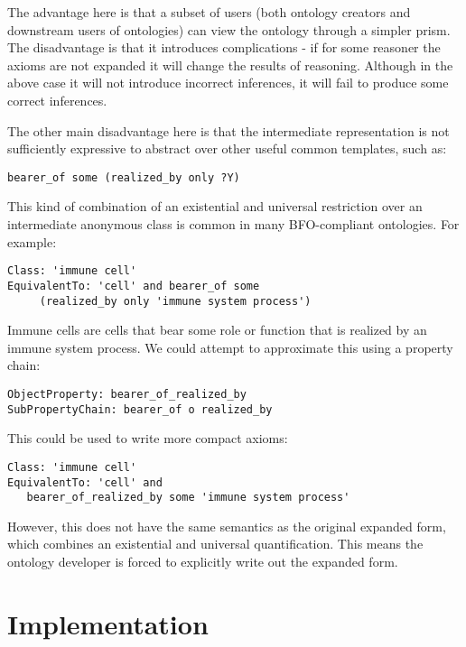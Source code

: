 \documentclass[11pt]{article}
\begin{document}

The advantage here is that a subset of users (both ontology creators
and downstream users of ontologies) can view the ontology through a
simpler prism. The disadvantage is that it introduces complications -
if for some reasoner the axioms are not expanded it will change the
results of reasoning. Although in the above case it will not introduce
incorrect inferences, it will fail to produce some correct inferences.

The other main disadvantage here is that the intermediate
representation is not sufficiently expressive to abstract over other
useful common templates, such as:

\begin{verbatim}
bearer_of some (realized_by only ?Y)
\end{verbatim}

This kind of combination of an existential and universal restriction
over an intermediate anonymous class is common in many BFO-compliant
ontologies. For example:

\begin{verbatim}
Class: 'immune cell'
EquivalentTo: 'cell' and bearer_of some 
     (realized_by only 'immune system process')
\end{verbatim}

Immune cells are cells that bear some role or function that is
realized by an immune system process.  We could attempt to approximate
this using a property chain:

\begin{verbatim}
ObjectProperty: bearer_of_realized_by
SubPropertyChain: bearer_of o realized_by
\end{verbatim}

This could be used to write more compact axioms:

\begin{verbatim}
Class: 'immune cell'
EquivalentTo: 'cell' and 
   bearer_of_realized_by some 'immune system process'
\end{verbatim}

However, this does not have the same semantics as the original
expanded form, which combines an existential and universal
quantification. This means the ontology developer is forced to
explicitly write out the expanded form.

\section{Implementation}
\end{document}
